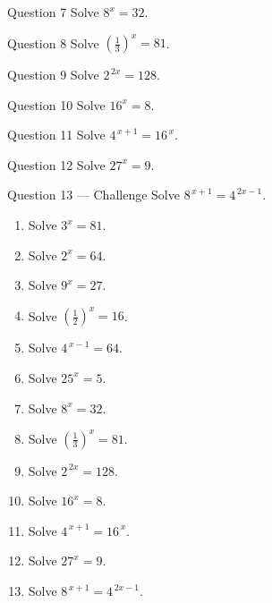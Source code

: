 \documentclass[11pt]{article}
\begin{document}
\begin{qbox}{Question 7}
Solve $8^{x}=32$.\workspace{2.4cm}
\end{qbox}

\begin{qbox}{Question 8}
Solve $\left(\tfrac13\right)^{x}=81$.\workspace{2.4cm}
\end{qbox}

\begin{qbox}{Question 9}
Solve $2^{\,2x}=128$.\workspace{2.4cm}
\end{qbox}

\begin{qbox}{Question 10}
Solve $16^{x}=8$.\workspace{2.4cm}
\end{qbox}

\begin{qbox}{Question 11}
Solve $4^{\,x+1}=16^{\,x}$.\workspace{2.4cm}
\end{qbox}

\begin{qbox}{Question 12}
Solve $27^{x}=9$.\workspace{2.4cm}
\end{qbox}

\begin{qbox}{Question 13 --- Challenge}
Solve $8^{\,x+1}=4^{\,2x-1}$.\workspace{3cm}
\end{qbox}

\clearpage
{}

\begin{recapbox}
\begin{multicols}{2}
\small
\begin{enumerate}[leftmargin=*,itemsep=3pt]
  \item Solve $3^{x}=81$.
  \item Solve $2^{x}=64$.
  \item Solve $9^{x}=27$.
  \item Solve $\left(\tfrac12\right)^{x}=16$.
  \item Solve $4^{\,x-1}=64$.
  \item Solve $25^{x}=5$.
  \item Solve $8^{x}=32$.
  \item Solve $\left(\tfrac13\right)^{x}=81$.
  \item Solve $2^{\,2x}=128$.
  \item Solve $16^{x}=8$.
  \item Solve $4^{\,x+1}=16^{\,x}$.
  \item Solve $27^{x}=9$.
  \item Solve $8^{\,x+1}=4^{\,2x-1}$.
\end{enumerate}
\end{multicols}
\end{recapbox}
\end{document}
